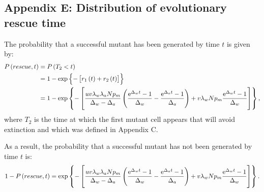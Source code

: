 \documentclass[12pt]{extarticle}
\newcommand{\e}{{\rm e}}
\begin{document}
\begin{appendices}
\section*{Appendix E: Distribution of evolutionary rescue time}
The probability that a successful mutant has been generated by time $t$ is given by:
\begin{align*}
P\left(rescue,t\right)&=P\left(T_2<t\right)\\
&=1-\exp\left\{-\left[r_1\left(t\right)+r_2\left(t\right)\right]\right\}\\
&=1-\exp\left\{-\left[\frac{uv\lambda_w\lambda_aNp_m}{\Delta_w-\Delta_a}\left(\frac{\e^{\Delta_wt}-1}{\Delta_w}-\frac{\e^{\Delta_at}-1}{\Delta_a}\right)+ v\lambda_wNp_m\frac{\e^{\Delta_w t}-1}{\Delta_w}\right]\right\},
\end{align*}
where $T_2$ is the time at which the first mutant cell appears that will avoid extinction and which was defined in Appendix C.

As a result, the probability that a successful mutant has not been generated by time $t$ is:
\begin{equation}
1-P\left(rescue,t\right)=\exp\left\{-\left[\frac{uv\lambda_w\lambda_aNp_m}{\Delta_w-\Delta_a}\left(\frac{\e^{\Delta_wt}-1}{\Delta_w}-\frac{\e^{\Delta_at}-1}{\Delta_a}\right)+ v\lambda_wNp_m\frac{\e^{\Delta_w t}-1}{\Delta_w}\right]\right\}.
\end{equation}

\end{appendices}
\end{document}
